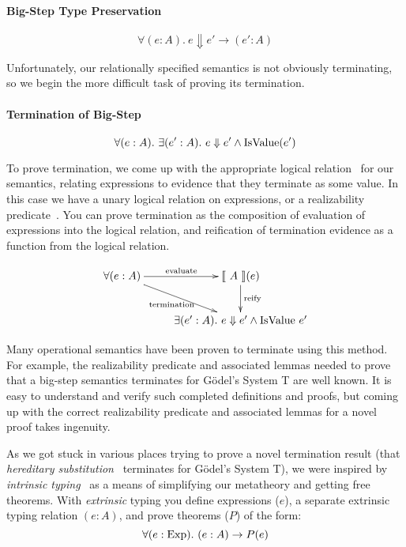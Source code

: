 \documentclass[preprint,nonatbib]{sigplanconf}
\numberwithin{mysubdfn}{mydfn}
\def\bigstep{\Downarrow}
\def\marr{\rightarrow}
\newcommand{\ascribe}[2]{(#1 : #2)}
\newcommand{\all}[1]{\forall#1.~}
\newcommand{\ex}[1]{\exists#1.~}
\newcommand{\el}[1]{\llbracket ~ #1 ~ \rrbracket}
\newcommand{\con}[1]{\textmd{#1}}
\newcommand{\fun}[1]{\textmd{#1}}
\begin{document}
\paragraph{Big-Step Type Preservation}

$$
\all{\ascribe{e}{A}} e \bigstep e' \marr \ascribe{e'}{A}
$$



Unfortunately, our relationally specified semantics is not obviously
terminating, so we begin the more difficult task of proving its
termination.

\paragraph{Termination of Big-Step}

$$
\all{\ascribe{e}{A}} \ex{\ascribe{e'}{A}} e \bigstep e' \land \fun{IsValue}(e')
$$

To prove termination, we come up with the appropriate logical
relation~\cite{TODO} for our semantics, relating expressions to evidence
that they terminate as some value.
In this case we have a unary
logical relation on expressions, or a realizability
predicate~\cite{TODO}. You can prove termination as the composition of
evaluation of expressions into the logical relation, and reification
of termination evidence as a function from the logical relation.

\begin{displaymath}
    \xymatrix{
          {\forall (e : A)} 
          \ar[dr]_{\fun{termination}}
          \ar[r]^{\fun{evaluate}}
        & {\el{A}(e)}
          \ar[d]^{\large{\fun{reify}}}
\\      & {\exists (e' : A). ~ e \bigstep e' \wedge \fun{IsValue} ~ e'} }
\end{displaymath}

Many operational semantics have been proven to terminate using this
method. For example, the realizability predicate and associated lemmas
needed to prove that a big-step semantics terminates for G{\"o}del's
System T are well known. It is easy to understand and verify such
completed definitions and proofs, but coming up with the correct
realizability predicate and associated lemmas for a novel proof takes
ingenuity. 

As we got stuck in various places trying to prove a novel termination result
(that {\it hereditary substitution}~\cite{TODO} terminates for
G{\"o}del's System T), we were inspired by
{\it intrinsic typing}~\cite{TODO} as a means of simplifying our
metatheory and getting free theorems. With {\it extrinsic} typing you
define expressions ($e$), a separate extrinsic typing relation $\ascribe{e}{A}$, and prove
theorems ($P$) of the form:
$$
\all{\ascribe{e}{\con{Exp}}} \ascribe{e}{A} \marr P(e) $$
\end{document}
